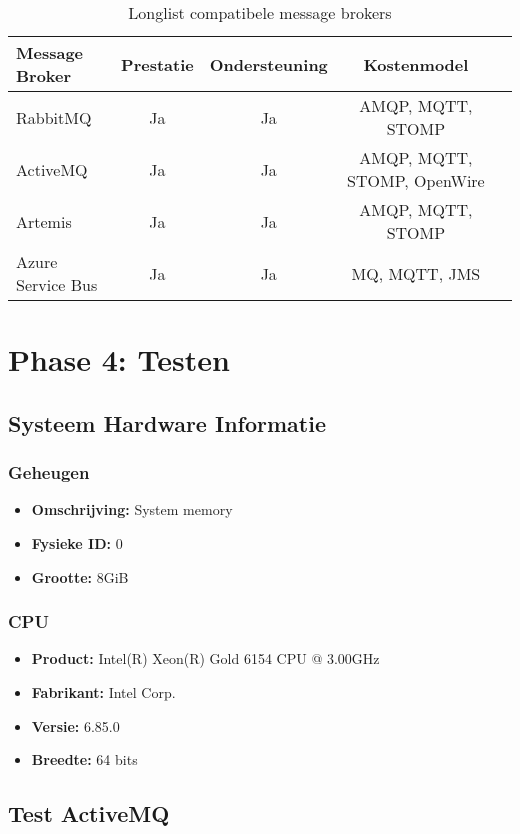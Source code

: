 \begin{table}[h!]
\footnotesize
\centering
\begin{tabular}{|l|c|c|c|c|}
\hline
Message Broker & Prestatie & Ondersteuning & Kostenmodel \\
\hline
RabbitMQ & Ja & Ja & AMQP, MQTT, STOMP \\
\hline
ActiveMQ & Ja & Ja & AMQP, MQTT, STOMP, OpenWire \\ 
\hline
Artemis & Ja & Ja & AMQP, MQTT, STOMP  \\
\hline
Azure Service Bus & Ja & Ja & MQ, MQTT, JMS  \\
\hline
\end{tabular}
\caption{\label{tab:message_brokers_filtered}Longlist compatibele message brokers}
\end{table}

\section{Phase 4: Testen}

\subsection{Systeem Hardware Informatie}
\subsubsection*{Geheugen}
\begin{itemize}
    \item \textbf{Omschrijving:} System memory
    \item \textbf{Fysieke ID:} 0
    \item \textbf{Grootte:} 8GiB
\end{itemize}

\subsubsection*{CPU}
\begin{itemize}
    \item \textbf{Product:} Intel(R) Xeon(R) Gold 6154 CPU @ 3.00GHz
    \item \textbf{Fabrikant:} Intel Corp. 
    \item \textbf{Versie:} 6.85.0
    \item \textbf{Breedte:} 64 bits
\end{itemize}

\subsection{Test ActiveMQ}

